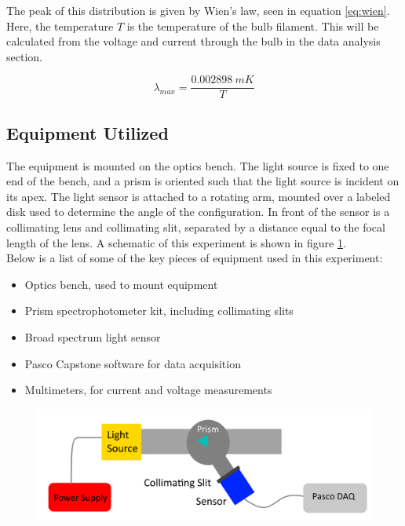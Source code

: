 \documentclass[a4paper]{article}
\begin{document}
\qq The peak of this distribution is given by Wien's law, seen in equation \ref{eq:wien}. Here, the temperature $T$ is the temperature of the bulb filament. This will be calculated from the voltage and current through the bulb in the data analysis section.

\begin{equation}
\label{eq:wien}
\lambda_{max} = \frac{0.002898 \: mK}{T}
\end{equation}

\subsection{Equipment Utilized}

\qq The equipment is mounted on the optics bench. The light source is fixed to one end of the bench, and a prism is oriented such that the light source is incident on its apex. The light sensor is attached to a rotating arm, mounted over a labeled disk used to determine the angle of the configuration. In front of the sensor is a collimating lens and collimating slit, separated by a distance equal to the focal length of the lens. A schematic of this experiment is shown in figure \ref{blackbody_circuit}. \\

Below is a list of some of the key pieces of equipment used in this experiment:

\begin{itemize}
\item Optics bench, used to mount equipment
\item Prism spectrophotometer kit, including collimating slits
\item Broad spectrum light sensor
\item Pasco Capstone software for data acquisition
\item Multimeters, for current and voltage measurements
\end{itemize}

\begin{figure}[H]
\centering
\includegraphics[width=\textwidth]{blackbody_circuit.png}
\label{blackbody_circuit}
\end{figure}
\end{document}
